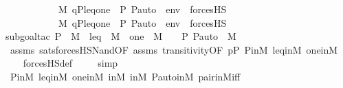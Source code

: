 \begin{isabellebody}
\ \ \ \ \ \ \ \ \ \ \ M{\isacharcomma}{\kern0pt}\ {\isacharbrackleft}{\kern0pt}q{\isacharcomma}{\kern0pt}P{\isacharcomma}{\kern0pt}leq{\isacharcomma}{\kern0pt}one{\isacharcomma}{\kern0pt}{\isacharless}{\kern0pt}{\isasymF}{\isacharcomma}{\kern0pt}\ {\isasymG}{\isacharcomma}{\kern0pt}\ P{\isacharcomma}{\kern0pt}\ P{\isacharunderscore}{\kern0pt}auto{\isachargreater}{\kern0pt}{\isacharbrackright}{\kern0pt}\ {\isacharat}{\kern0pt}\ env\ {\isasymTurnstile}\ forcesHS{\isacharparenleft}{\kern0pt}{\isasymphi}{\isacharparenright}{\kern0pt}\ {\isasymand}\ \isanewline
\ \ \ \ \ \ \ \ \ \ \ M{\isacharcomma}{\kern0pt}\ {\isacharbrackleft}{\kern0pt}q{\isacharcomma}{\kern0pt}P{\isacharcomma}{\kern0pt}leq{\isacharcomma}{\kern0pt}one{\isacharcomma}{\kern0pt}{\isacharless}{\kern0pt}{\isasymF}{\isacharcomma}{\kern0pt}\ {\isasymG}{\isacharcomma}{\kern0pt}\ P{\isacharcomma}{\kern0pt}\ P{\isacharunderscore}{\kern0pt}auto{\isachargreater}{\kern0pt}{\isacharbrackright}{\kern0pt}\ {\isacharat}{\kern0pt}\ env\ {\isasymTurnstile}\ forcesHS{\isacharparenleft}{\kern0pt}{\isasympsi}{\isacharparenright}{\kern0pt}{\isacharparenright}{\kern0pt}{\isachardoublequoteclose}\isanewline
%
\isadelimproof
\ \ %
\endisadelimproof
%
\isatagproof
{}\isamarkupfalse%
{\isacharparenleft}{\kern0pt}subgoal{\isacharunderscore}{\kern0pt}tac\ {\isachardoublequoteopen}P\ {\isasymin}\ M\ {\isasymand}\ leq\ {\isasymin}\ M\ {\isasymand}\ one\ {\isasymin}\ M\ {\isasymand}\ {\isacharless}{\kern0pt}{\isasymF}{\isacharcomma}{\kern0pt}\ {\isasymG}{\isacharcomma}{\kern0pt}\ P{\isacharcomma}{\kern0pt}\ P{\isacharunderscore}{\kern0pt}auto{\isachargreater}{\kern0pt}\ {\isasymin}\ M{\isachardoublequoteclose}{\isacharparenright}{\kern0pt}\isanewline
\ \ \isamarkupfalse%
\ assms\ sats{\isacharunderscore}{\kern0pt}forcesHS{\isacharunderscore}{\kern0pt}Nand{\isacharbrackleft}{\kern0pt}OF\ assms{\isacharparenleft}{\kern0pt}{}{\isacharminus}{\kern0pt}{}{\isacharparenright}{\kern0pt}\ transitivity{\isacharbrackleft}{\kern0pt}OF\ {\isacartoucheopen}p{\isasymin}P{\isacartoucheclose}{\isacharbrackright}{\kern0pt}{\isacharbrackright}{\kern0pt}\ P{\isacharunderscore}{\kern0pt}in{\isacharunderscore}{\kern0pt}M\ leq{\isacharunderscore}{\kern0pt}in{\isacharunderscore}{\kern0pt}M\ one{\isacharunderscore}{\kern0pt}in{\isacharunderscore}{\kern0pt}M\ \isanewline
\ \ \isamarkupfalse%
\ forcesHS{\isacharunderscore}{\kern0pt}def\isanewline
\ \ \ \isamarkupfalse%
\ simp\isanewline
\ \ \isamarkupfalse%
\ P{\isacharunderscore}{\kern0pt}in{\isacharunderscore}{\kern0pt}M\ leq{\isacharunderscore}{\kern0pt}in{\isacharunderscore}{\kern0pt}M\ one{\isacharunderscore}{\kern0pt}in{\isacharunderscore}{\kern0pt}M\ {\isasymF}{\isacharunderscore}{\kern0pt}in{\isacharunderscore}{\kern0pt}M\ {\isasymG}{\isacharunderscore}{\kern0pt}in{\isacharunderscore}{\kern0pt}M\ P{\isacharunderscore}{\kern0pt}auto{\isacharunderscore}{\kern0pt}in{\isacharunderscore}{\kern0pt}M\ pair{\isacharunderscore}{\kern0pt}in{\isacharunderscore}{\kern0pt}M{\isacharunderscore}{\kern0pt}iff\isanewline

\end{isabellebody}
